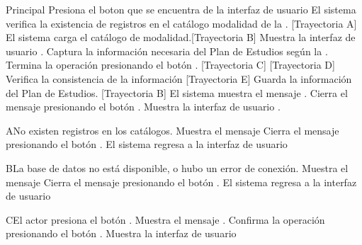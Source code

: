 \begin{UCtrayectoria}{Principal}
    \UCpaso[\UCactor] Presiona el boton \IUbutton{+} que se encuentra de la interfaz de usuario 
	\UCpaso  El sistema verifica la existencia de registros en el catálogo modalidad de la  . [Trayectoria A] 
    \UCpaso El sistema carga el catálogo de modalidad.[Trayectoria B]
    \UCpaso Muestra la interfaz de usuario .
    \UCpaso[\UCactor] Captura la información necesaria del Plan de Estudios según la .
    \UCpaso[\UCactor] Termina la operación presionando el botón . [Trayectoria C] [Trayectoria D]
    \UCpaso Verifica la consistencia de la información [Trayectoria E]
    \UCpaso Guarda la información del Plan de Estudios. [Trayectoria B]
    \UCpaso El sistema muestra el mensaje .
    \UCpaso[\UCactor] Cierra el mensaje presionando el botón .
    \UCpaso Muestra la interfaz de usuario .
\end{UCtrayectoria}


\begin{UCtrayectoriaA}{A}{No existen registros en los catálogos.}
	\UCpaso Muestra el mensaje 
	\UCpaso[\UCactor] Cierra el mensaje presionando el botón .
	\UCpaso El sistema regresa a la interfaz de usuario 
\end{UCtrayectoriaA}

\begin{UCtrayectoriaA}{B}{La base de datos no está disponible, o hubo un error de conexión.}
	\UCpaso Muestra el mensaje 
	\UCpaso[\UCactor] Cierra el mensaje presionando el botón .
    \UCpaso El sistema regresa a la interfaz de usuario 
\end{UCtrayectoriaA}

\begin{UCtrayectoriaA}{C}{El actor presiona el botón .}
	\UCpaso Muestra el mensaje .
	\UCpaso[\UCactor] Confirma la operación presionando el botón .
	\UCpaso Muestra la interfaz de usuario 
\end{UCtrayectoriaA}


